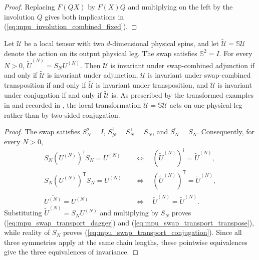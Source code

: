 \begin{proof}\leanok
    Replacing $F(QX)$ by $F(X)Q$ and multiplying on the left by the
    involution $Q$ gives both implications in
    (\ref{eq:mpu_involution_combined_fixed}).
\end{proof}

\begin{lemma}
    \label{thm:mpu_one_sided_swap_invariance}
    \leanok
    Let $\mathcal U$ be a local tensor with two $d$-dimensional physical
    spins, and let $\widetilde{\mathcal U}=\mathbb S\mathcal U$ denote the
    action on its output physical leg. The swap satisfies $\mathbb S^2=I$.
    For every $N>0$,
    $\widetilde U^{(N)}=S_NU^{(N)}$. Then $\mathcal U$ is invariant under
    swap-combined adjunction if and only if $\widetilde{\mathcal U}$ is
    invariant under adjunction, $\mathcal U$ is invariant under
    swap-combined transposition if and only if $\widetilde{\mathcal U}$ is
    invariant under transposition, and $\mathcal U$ is invariant under
    conjugation if and only if $\widetilde{\mathcal U}$ is.
    As prescribed by the transformed examples in
    \cite[Section~VI.B.1]{Cirac2017MPU} and recorded in
    \cite{gap:mpu_swap_symmetry_one_sided}, the local transformation
    $\widetilde{\mathcal U}=\mathbb S\mathcal U$ acts on one physical leg
    rather than by two-sided conjugation.
\end{lemma}

\begin{proof}\leanok
    The swap satisfies
    $S_N^2=I$, $S_N^\dagger=S_N^{\mathsf T}=S_N$, and
    $\overline{S_N}=S_N$. Consequently, for every $N>0$,
    \begin{align}
        S_N(U^{(N)})^\dagger S_N=U^{(N)}
         & \quad\Longleftrightarrow\quad
        (\widetilde U^{(N)})^\dagger=\widetilde U^{(N)},
        \label{eq:mpu_swap_transport_dagger}    \\
        S_N(U^{(N)})^{\mathsf T}S_N=U^{(N)}
         & \quad\Longleftrightarrow\quad
        (\widetilde U^{(N)})^{\mathsf T}=\widetilde U^{(N)},
        \label{eq:mpu_swap_transport_transpose} \\
        \overline{U^{(N)}}=U^{(N)}
         & \quad\Longleftrightarrow\quad
        \overline{\widetilde U^{(N)}}=\widetilde U^{(N)}.
        \label{eq:mpu_swap_transport_conjugation}
    \end{align}
    Substituting $\widetilde U^{(N)}=S_NU^{(N)}$ and multiplying by
    $S_N$ proves (\ref{eq:mpu_swap_transport_dagger}) and
    (\ref{eq:mpu_swap_transport_transpose}), while reality of $S_N$ proves
    (\ref{eq:mpu_swap_transport_conjugation}). Since all three symmetries
    apply at the same chain lengths, these pointwise equivalences give the
    three equivalences of invariance.
\end{proof}

